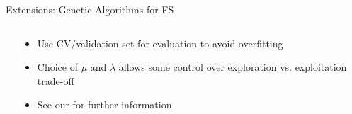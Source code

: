 \documentclass[11pt,compress,t,notes=noshow, xcolor=table]{beamer}
\begin{document}
\begin{vbframe}{Extensions: Genetic Algorithms for FS}
\begin{columns}[c]
\begin{column}{0.5\textwidth}
    \end{column}
    \begin{column}{0.5\textwidth}
        \begin{itemize}
        \setlength{\itemsep}{0.8em}
            \item Use CV/validation set for evaluation to avoid overfitting
            \item Choice of $\mu$ and $\lambda$ allows some control over exploration vs. exploitation trade-off
            \item See our  for further information
        \end{itemize}
    \end{column}
\end{columns}

\end{vbframe}


\end{document}
